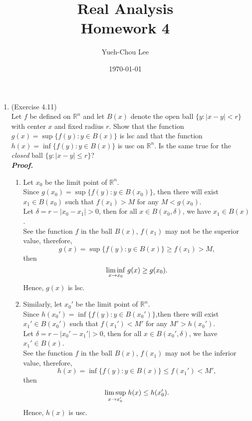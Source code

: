 \documentclass[a4paper,11pt]{article}
\title{Real Analysis \\ Homework 4}
\author{Yueh-Chou Lee}
\date{\today}
\begin{document}
\maketitle
\begin{enumerate}

\item (Exercise 4.11)\\
Let $f$ be defined on $\mathbb{R}^n$ and let $B(x)$ denote the open ball $\{ y:|x-y|<r\}$ with center $x$ and fixed radius $r$. Show that the function $g(x) = \sup \{ f(y):y \in B(x) \}$ is lsc and that the function $h(x) = \inf \{ f(y):y \in B(x) \}$ is usc on $\mathbb{R}^n$. Is the same true for the \textit{closed} ball $\{ y:|x-y| \leq r \}$?\\
\newline
\textit{\textbf {Proof.}}

\begin{enumerate}

\item
Let $x_0$ be the limit point of $\mathbb{R}^n$.\\
Since $g(x_0) = \sup\{ f(y) : y \in B(x_0) \}$, then there will exist $x_1 \in B(x_0)$ such that $f(x_1) > M$ for any $M < g(x_0)$.\\
Let $\delta = r - |x_0 - x_1| > 0$, then for all $x \in B(x_0, \delta)$, we have $x_1 \in B(x)$.\\
See the function $f$ in the ball $B(x)$, $f(x_1)$ may not be the superior value, therefore,
$$g(x) = \sup \{ f(y) : y \in B(x)\} \geq f(x_1) > M,$$ 
then
$$\underset{x \to x_0}{\lim \inf} \hspace{0.1cm} g(x) \geq g(x_0).$$
Hence, $g(x)$ is lsc.\\

\item 
Similarly, let $x_0'$ be the limit point of $\mathbb{R}^n$.\\
Since $h(x_0') = \inf \{ f(y) : y \in B(x_0')\}$,then there will exist $x_1' \in B(x_0')$ such that $f(x_1') < M'$ for any $M' > h(x_0')$.\\
Let $\delta = r - |x_0' - x_1'| > 0$, then for all $x \in B(x_0', \delta)$, we have $x_1' \in B(x)$.\\
See the function $f$ in the ball $B(x)$, $f(x_1)$ may not be the inferior value, therefore,
$$h(x) = \inf \{ f(y) : y \in B(x)\} \leq f(x_1') < M',$$ 
then
$$\underset{x \to x_0'}{\lim \sup} \hspace{0.1cm} h(x) \leq h(x_0').$$
Hence, $h(x)$ is usc.\\


\end{enumerate}
\end{enumerate}
\end{document}
